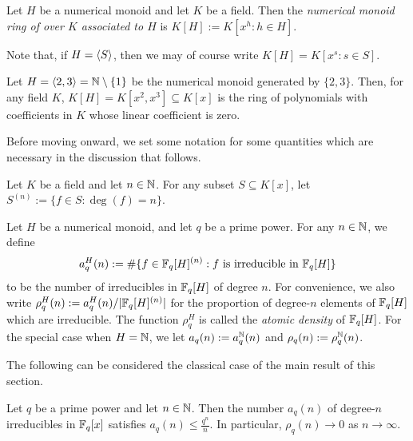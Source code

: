 \begin{defn}
	Let $H$ be a numerical monoid and let $K$ be a field.
	Then the \textit{numerical monoid ring of over $K$ associated to $H$} is $K[H] := K[x^h : h\in H]$.
	
	Note that, if $H = \langle S \rangle$, then we may of course write $K[H] = K[x^s: s\in S]$.
\end{defn}


\begin{eg}
	Let $H = \langle 2,3 \rangle = \mathbb{N} \setminus \{1\}$ be the numerical monoid generated by $\{2,3\}$.
	Then, for any field $K$, $K[H] = K[x^2,x^3] \subseteq K[x]$ is the ring of polynomials with coefficients in $K$ whose linear coefficient is zero.
\end{eg}

Before moving onward, we set some notation for some quantities which are necessary in the discussion that follows.

\begin{defn}
	Let $K$ be a field and let $n\in \mathbb{N}$.
	For any subset $S \subseteq K[x]$, let $S^{(n)} := \{f\in S: \deg(f) = n\}$.
	
	Let $H$ be a numerical monoid, and let $q$ be a prime power.
	For any $n\in \mathbb{N}$, we define 
	\[a_q^H(n) := \#\{f\in \mathbb{F}_q[H]^{(n)}: f \textrm{ is irreducible in } \mathbb{F}_q[H] \}\]
	to be the number of irreducibles in $\mathbb{F}_q[H]$ of degree $n$.
	For convenience, we also write $\rho_q^H(n) := a_q^H(n)/|\mathbb{F}_q[H]^{(n)}|$ for the proportion of degree-$n$ elements of $\mathbb{F}_q[H]$ which are irreducible.
	The function $\rho_q^H$ is called the \textit{atomic density} of $\mathbb{F}_q[H]$.
	For the special case when $H = \mathbb{N}$, we let $a_q(n) := a_q^{\mathbb{N}}(n)$ and $\rho_q(n) := \rho_q^{\mathbb{N}}(n)$.
\end{defn}

The following can be considered the classical case of the main result of this section.

\begin{prop}\label{prop:atoms in Fqx}
	Let $q$ be a prime power and let $n\in \mathbb{N}$.
	Then the number $a_q(n)$ of degree-$n$ irreducibles in $\mathbb{F}_q[x]$ satisfies $a_q(n) \le \frac{q^n}{n}$.
	In particular, $\rho_q(n) \to 0$ as $n\to\infty$.
\end{prop}

